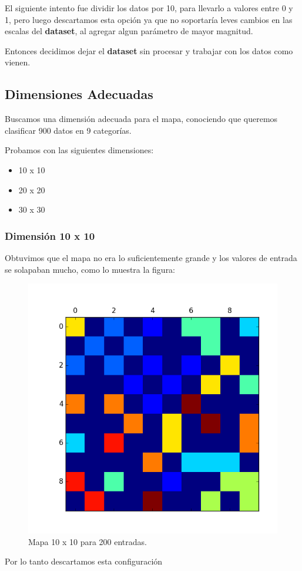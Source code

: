 El siguiente intento fue dividir los datos por 10, para llevarlo a valores entre
0 y 1, pero luego descartamos esta opción ya que no soportaría leves cambios 
en las escalas del \textbf{dataset}, al agregar algun parámetro de mayor magnitud.

Entonces decidimos dejar el \textbf{dataset} sin procesar y trabajar con los datos como
vienen.


\subsection{Dimensiones Adecuadas}

Buscamos una dimensión adecuada para el mapa, conociendo que queremos
clasificar 900 datos en 9 categorías.

Probamos con las siguientes dimensiones:

\begin{itemize}
	\item 10 x 10
	\item 20 x 20
	\item 30 x 30
\end{itemize}

\subsubsection{Dimensión 10 x 10 }

Obtuvimos que el mapa no era lo suficientemente grande y los valores de
entrada se solapaban mucho, como lo muestra la figura:

\begin{figure}[H]
  \centering
  \includegraphics[width=0.5\columnwidth]{secciones/graficos/kohonen/mapa1010.png}
  \caption{Mapa 10 x 10 para 200 entradas.}
  \label{fig:mapa 10 10 200}
\end{figure}


Por lo tanto descartamos esta configuración

